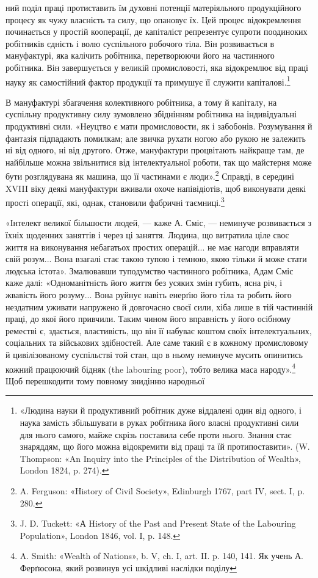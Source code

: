 ний поділ праці протиставить їм духовні потенції матеріяльного
продукційного процесу як чужу власність та силу, що опановує
їх. Цей процес відокремлення починається у простій кооперації,
де капіталіст репрезентує супроти поодиноких робітників єдність
і волю суспільного робочого тіла. Він розвивається в мануфактурі,
яка калічить робітника, перетворюючи його на частинного
робітника. Він завершується у великій промисловості, яка відокремлює
від праці науку як самостійний фактор продукції та
примушує її служити капіталові.\footnote{
«Людина науки й продуктивний робітник дуже віддалені один від
одного, і наука замість збільшувати в руках робітника його власні продуктивні
сили для нього самого, майже скрізь поставила себе проти нього.
Знання стає знаряддям, що його можна відокремити від праці та їй протипоставити».
(W. Thompson: «An Inquiry into the Principles of the
Distribution of Wealth», London 1824, p. 274).
}

В мануфактурі збагачення колективного робітника, а тому
й капіталу, на суспільну продуктивну силу зумовлено збіднінням
робітника на індивідуальні продуктивні сили. «Неуцтво є
мати промисловости, як і забобонів. Розумування й фантазія
підпадають помилкам; але звичка рухати ногою або рукою не
залежить ні від одного, ні від другого. Отже, мануфактури процвітають
найкраще там, де найбільше можна звільнитися від
інтелектуальної роботи, так що майстерня може бути розглядувана
як машина, що її частинами є люди».\footnote{
A. Ferguson: «History of Civil Society», Edinburgh 1767,
part IV, sect. I, p. 280.
} Справді, в середині
XVIII віку деякі мануфактури вживали охоче напівідіотів,
щоб виконувати деякі прості операції, які, однак, становили
фабричні таємниці.\footnote{
J. D. Tuckett: «А History of the Past and Present State of
the Labouring Population», London 1846, vol. I, p. 148.
}

«Інтелект великої більшости людей, — каже А. Сміс, — неминуче
розвивається з їхніх щоденних заняттів і через ці заняття.
Людина, що витратила ціле своє життя на виконування небагатьох
простих операцій... не має нагоди вправляти свій розум... Вона
взагалі стає такою тупою і темною, якою тільки й може стати
людська істота». Змалювавши туподумство частинного робітника,
Адам Сміс каже далі: «Одноманітність його життя без усяких
змін губить, ясна річ, і жвавість його розуму... Вона руйнує
навіть енерґію його тіла та робить його нездатним уживати напружено
й довгочасно своєї сили, хіба лише в тій частинній
праці, до якої його привчили. Таким чином його вправність у його
осібному реместві є, здається, властивість, що він її набуває коштом
своїх інтелектуальних, соціальних та військових здібностей.
Але саме такий є в кожному промисловому й цивілізованому
суспільстві той стан, що в ньому неминуче мусить опинитись
кожний працюючий бідняк (the labouring poor), тобто велика маса
народу».\footnote{
A. Smith: «Wealth of Nations», b. V, ch. I, art. II. p. 140, 141.
Як учень А. Ферґюсона, який розвинув усі шкідливі наслідки поділу
} Щоб перешкодити тому повному знидінню народньої